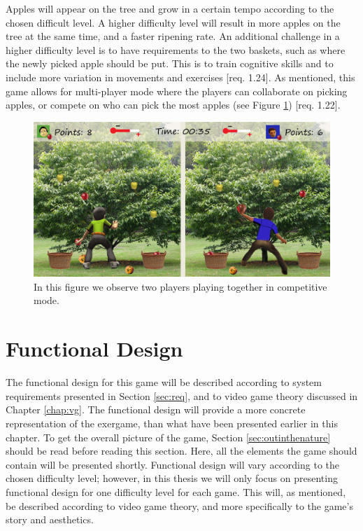 Apples will appear on the tree and grow in a certain tempo according to the chosen difficult level. A higher difficulty level will result in more apples on the tree at the same time, and a faster ripening rate. An additional challenge in a higher difficulty level is to have requirements to the two baskets, such as where the newly picked apple should be put. This is to train cognitive skills and to include more variation in movements and exercises [req. 1.24]. As mentioned, this game allows for multi-player mode where the players can collaborate on picking apples, or compete on who can pick the most apples (see Figure \ref{fig:appleMultiplayer}) [req. 1.22]. 

\begin{figure} [H]
\centering
\includegraphics[scale=0.07]{gameapple2playerEngelsk.jpg}
\caption[Picking apples - multi-player]{In this figure we observe two players playing together in competitive mode.}
\label{fig:appleMultiplayer}
\end{figure}

\section{Functional Design}
\label{sec:functionaldesign}

The functional design for this game will be described according to system requirements presented in Section \ref{sec:req}, and to video game theory discussed in Chapter \ref{chap:vg}. The functional design will provide a more concrete representation of the exergame, than what have been presented earlier in this chapter. To get the overall picture of the game, Section \ref{sec:outinthenature} should be read before reading this section. Here, all the elements the game should contain will be presented shortly. Functional design will vary according to the chosen difficulty level; however, in this thesis we will only focus on presenting functional design for one difficulty level for each game. This will, as mentioned, be described according to video game theory, and more specifically to the game's story and aesthetics.  

